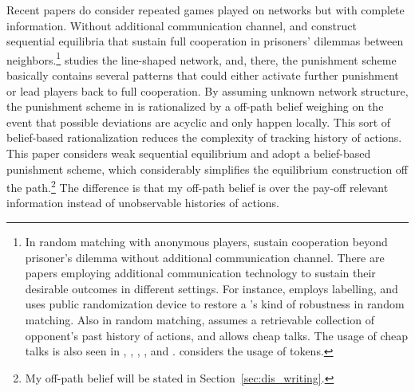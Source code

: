 \documentclass[12pt,letter]{article}
\theoremstyle{definition}
\theoremstyle{remark}
\theoremstyle{claim}
\begin{document}
Recent papers do consider repeated games played on networks but with complete information. Without additional communication channel, \citep{Xue2004} and \citep{Nava2014} construct sequential equilibria that sustain full cooperation in prisoners' dilemmas between neighbors.\footnote{In random matching with anonymous players, \citep{Deb2019a} sustain cooperation beyond prisoner's dilemma without additional communication channel. There are papers employing additional communication technology to sustain their desirable outcomes in different settings. For instance, \citep{Kandori1992} employs labelling, and \citep{Ellison1994} uses public randomization device to restore a \citep{Kandori1992}'s kind of robustness in random matching. Also in random matching, \citep{Takahashi2010} assumes a retrievable collection of opponent's past history of actions, and \citep{Deb2019b} allows cheap talks. The usage of cheap talks is also seen in \citep{Ben-Porath1996}, \citep{Tomala2011}, \citep{LIPPERT2011}, \citep{Ali2016}, \citep{LACLAU2014136} and \citep{Laclau2012}. \citep{Wolitzky2014} considers the usage of tokens.}
\citep{Xue2004} studies the line-shaped network, and, there, the punishment scheme basically contains several patterns that could either activate further punishment or lead players back to full cooperation. By assuming unknown network structure, the punishment scheme in \citep{Nava2014} is rationalized by a off-path belief weighing on the event that possible deviations are acyclic and only happen locally. This sort of belief-based rationalization reduces the complexity of tracking history of actions. This paper considers weak sequential equilibrium and adopt a belief-based punishment scheme, which considerably simplifies the equilibrium construction off the path.\footnote{My off-path belief will be stated in Section~\ref{sec:dis_writing}.} 
The difference is that my off-path belief is over the pay-off relevant information instead of unobservable histories of actions. 
\end{document}
